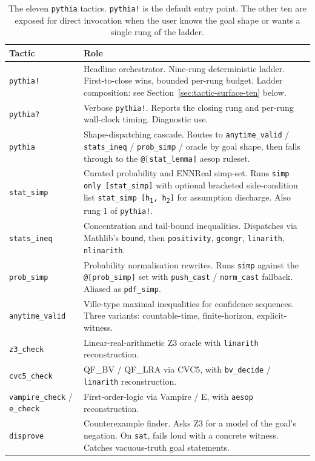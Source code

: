 \begin{table}[t]
\centering
\small
\begin{tabular}{p{}p{}}
\toprule
\textbf{Tactic} & \textbf{Role} \\
\midrule
\texttt{pythia!}
  & Headline orchestrator. Nine-rung deterministic ladder.
    First-to-close wins, bounded per-rung budget. Ladder
    composition: see Section~\ref{sec:tactic-surface-ten} below. \\
\texttt{pythia?}
  & Verbose \texttt{pythia!}. Reports the closing rung and per-rung
    wall-clock timing. Diagnostic use. \\
\texttt{pythia}
  & Shape-dispatching cascade. Routes to
    \texttt{anytime\_valid} / \texttt{stats\_ineq} /
    \texttt{prob\_simp} / oracle by goal shape, then falls through
    to the \texttt{@[stat\_lemma]} aesop ruleset. \\
\texttt{stat\_simp}
  & Curated probability and ENNReal simp-set. Runs
    \texttt{simp only [stat\_simp]} with optional bracketed
    side-condition list \texttt{stat\_simp [h\textsubscript{1}, h\textsubscript{2}]}
    for assumption discharge. Also rung 1 of \texttt{pythia!}. \\
\texttt{stats\_ineq}
  & Concentration and tail-bound inequalities. Dispatches via
    Mathlib's \texttt{bound}, then \texttt{positivity},
    \texttt{gcongr}, \texttt{linarith}, \texttt{nlinarith}. \\
\texttt{prob\_simp}
  & Probability normalisation rewrites. Runs \texttt{simp} against
    the \texttt{@[prob\_simp]} set with
    \texttt{push\_cast} / \texttt{norm\_cast} fallback. Aliased as
    \texttt{pdf\_simp}. \\
\texttt{anytime\_valid}
  & Ville-type maximal inequalities for confidence sequences.
    Three variants: countable-time, finite-horizon,
    explicit-witness. \\
\texttt{z3\_check}
  & Linear-real-arithmetic Z3 oracle with \texttt{linarith}
    reconstruction. \\
\texttt{cvc5\_check}
  & QF\_BV / QF\_LRA via CVC5, with \texttt{bv\_decide} /
    \texttt{linarith} reconstruction. \\
\texttt{vampire\_check} / \texttt{e\_check}
  & First-order-logic via Vampire / E, with \texttt{aesop}
    reconstruction. \\
\texttt{disprove}
  & Counterexample finder. Asks Z3 for a model of the goal's
    negation. On \texttt{sat}, fails loud with a concrete witness.
    Catches vacuous-truth goal statements. \\
\bottomrule
\end{tabular}
\caption{The eleven \texttt{pythia} tactics. \texttt{pythia!} is the
default entry point. The other ten are exposed for direct
invocation when the user knows the goal shape or wants a single
rung of the ladder.}
\label{tab:tactic-surface}
\end{table}

